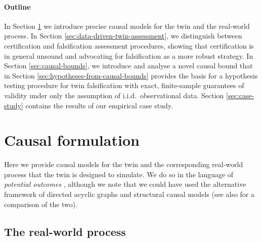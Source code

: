 %

\paragraph{Outline}

%
%
%
%

In Section \ref{sec:causal-formulation} we introduce precise causal models for the twin and the real-world process.
In Section \ref{sec:data-driven-twin-assessment}, we distinguish between certification and falsification assessment procedures, showing that certification is in general unsound and advocating for falsification as a more robust strategy.
%
In Section \ref{sec:causal-bounds}, we introduce and analyse a novel causal bound that in Section \ref{sec:hypotheses-from-causal-bounds} provides the basis for a hypothesis testing procedure for twin falsification with exact, finite-sample guarantees of validity under only the assumption of i.i.d.\ observational data.
%
Section \ref{sec:case-study} contains the results of our empirical case study. %
%
%
%

%

\section{Causal formulation} \label{sec:causal-formulation}

Here we provide causal models for the twin and the corresponding real-world process that the twin is designed to simulate.
We do so in the language of \emph{potential outcomes} \cite{rubin1974estimating,rubin2005causal}, although we note that we could have used the alternative framework of directed acyclic graphs and structural causal models \cite{pearl2009causality} (see also \cite{imbens2020potential} for a comparison of the two).
%

\subsection{The real-world process}

